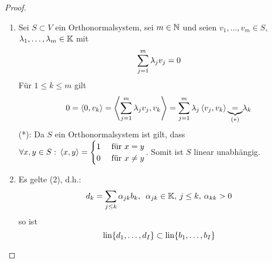 \begin{proof}\hfill
    \begin{enumerate}
        \item 
        Sei $S\subset V$ ein Orthonormalsystem, sei $m\in \N$ und seien $v_1, \dots,
        v_m \in S$, $\lambda_1, \dots, \lambda_m \in \K$ mit \[
            \dsum_{j=1}^m \lambda_j v_j = 0\]
        Für $1\leq k \leq m$ gilt \[
            0 = \scp{0, v_k} = \scp{\dsum_{j=1}^m \lambda_j v_j, v_k} = 
            \dsum_{j=1}^m \lambda_j \scp{v_j, v_k} \underset{(*)}{\underbrace{=}}
            \lambda_k\]
            (*): Da $S$ ein Orthonormalsystem ist gilt, dass $\forall x,y \in S:
            \smallspace \scp{x,y} = \begin{cases}
                1 & \fuer x=y\\
                0 & \fuer x \neq y
            \end{cases}$. Somit ist $S$ linear unabhängig.
        \item Es gelte (2), d.h.:\[
            d_k = \dsum_{j\leq k} \alpha_{jk}b_k, \midspace \alpha_{jk}\in \K, 
            \smallspace j\leq k,\smallspace \alpha_{kk} > 0 \]
            so ist \[
                \lin{d_1, \dots, d_I} \subset \lin{b_1, \dots, b_I}\]
            
    \end{enumerate}
\end{proof}